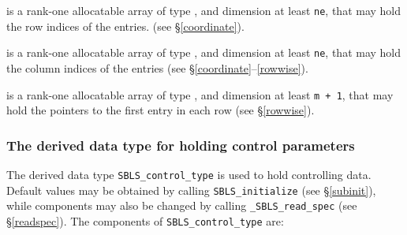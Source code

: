 \documentclass{galahad}
\newcommand{\packagename}{SBLS}
\newcommand{\fullpackagename}{\libraryname\_\packagename}
\begin{document}
\begin{description}
 is a rank-one allocatable array of type \integer,
and dimension at least {\tt ne}, that may hold the row indices of the entries.
(see \S\ref{coordinate}).

 is a rank-one allocatable array of type \integer,
and dimension at least {\tt ne}, that may hold the column indices of the entries
(see \S\ref{coordinate}--\ref{rowwise}).

 is a rank-one allocatable array of type \integer,
and dimension at least {\tt m + 1}, that may hold the pointers to
the first entry in each row (see \S\ref{rowwise}).

\end{description}



\subsubsection{The derived data type for holding control
 parameters}\label{typecontrol}
The derived data type
{\tt \packagename\_control\_type}
is used to hold controlling data. Default values may be obtained by calling
{\tt \packagename\_initialize}
(see \S\ref{subinit}),
while components may also be changed by calling
{\tt \fullpackagename\_read\-\_spec}
(see \S\ref{readspec}).
The components of
{\tt \packagename\_control\_type}
are:
\end{document}
